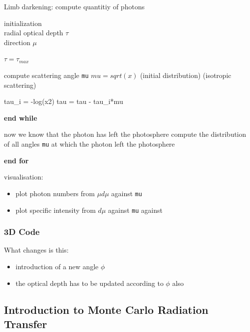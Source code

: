 \documentclass[../main/main.tex]{subfiles}
\begin{document}
\begin{algorithm}
\caption{Limb darkening: compute quantitiy of photons}\label{limb_darkening}
\begin{algorithmic}
\State initialization \\
\quad radial optical depth $\tau$ \\
\quad direction $\mu$


\State $\boxed{\tau = \tau_{max}}$
	
	\State compute scattering angle \texttt{mu}
	 $\boxed{mu = sqrt(x)}$ (initial distribution)
	 (isotropic scattering)
	\EndIf
	
	\State tau\_i = -log(x2) 
	\State tau = tau - tau\_i*mu	
		
	\EndWhile
	\State \textbf{end while}

	\State now we know that the photon has left the photosphere	
	\State compute the distribution of all angles \texttt{mu} at which the photon left the photosphere
	
\EndFor
\State \textbf{end for}

\State visualisation: 
	\begin{itemize}
	\item plot photon numbers from $\mu d\mu$ against \texttt{mu}
	\item plot specific intensity from $d\mu$ against \texttt{mu} against 
	\end{itemize}


\end{algorithmic}
\end{algorithm}


\subsubsection{3D Code}
What changes is this: 
\begin{itemize}
\item introduction of a new angle $\phi$
\item the optical depth has to be updated according to $\phi$ also
\end{itemize}


\newpage
\subsection{Introduction to Monte Carlo Radiation Transfer}
\end{document}
